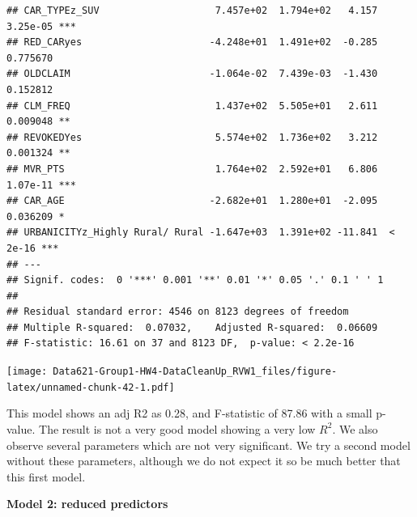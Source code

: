 \documentclass[]{article}
\begin{document}
\begin{verbatim}
## CAR_TYPEz_SUV                    7.457e+02  1.794e+02   4.157 3.25e-05 ***
## RED_CARyes                      -4.248e+01  1.491e+02  -0.285 0.775670    
## OLDCLAIM                        -1.064e-02  7.439e-03  -1.430 0.152812    
## CLM_FREQ                         1.437e+02  5.505e+01   2.611 0.009048 ** 
## REVOKEDYes                       5.574e+02  1.736e+02   3.212 0.001324 ** 
## MVR_PTS                          1.764e+02  2.592e+01   6.806 1.07e-11 ***
## CAR_AGE                         -2.682e+01  1.280e+01  -2.095 0.036209 *  
## URBANICITYz_Highly Rural/ Rural -1.647e+03  1.391e+02 -11.841  < 2e-16 ***
## ---
## Signif. codes:  0 '***' 0.001 '**' 0.01 '*' 0.05 '.' 0.1 ' ' 1
## 
## Residual standard error: 4546 on 8123 degrees of freedom
## Multiple R-squared:  0.07032,    Adjusted R-squared:  0.06609 
## F-statistic: 16.61 on 37 and 8123 DF,  p-value: < 2.2e-16
\end{verbatim}

\texttt{[image: Data621-Group1-HW4-DataCleanUp\_RVW1\_files/figure-latex/unnamed-chunk-42-1.pdf]}

This model shows an adj R2 as 0.28, and F-statistic of 87.86 with a
small p-value. The result is not a very good model showing a very low
\(R^2\). We also observe several parameters which are not very
significant. We try a second model without these parameters, although we
do not expect it so be much better that this first model.

\textbf{Model 2: reduced predictors}
\end{document}
